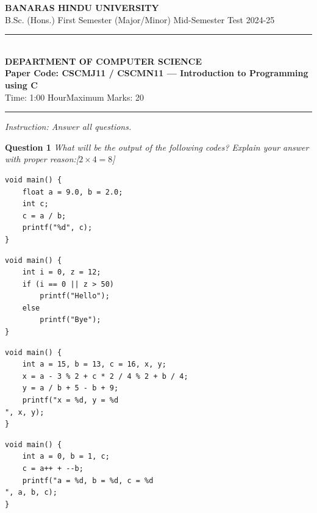 \documentclass[11pt,a4paper]{article}
\newcommand{\pts}[1]{\hfill   \textit{[#1]}}
\begin{document}
\begin{center}
  {\large\bfseries BANARAS HINDU UNIVERSITY}\\[2pt]
  {\normalsize B.Sc. (Hons.) First Semester (Major/Minor) Mid-Semester Test 2024-25}\\[6pt]
  \rule{0.8\linewidth}{0.5pt}\\[6pt]
  {\large\bfseries DEPARTMENT OF COMPUTER SCIENCE}\\[4pt]
  {\large\bfseries Paper Code: CSCMJ11 / CSCMN11 --- Introduction to Programming using C}\\[4pt]
  {\normalsize Time: 1:00 Hour\hfill Maximum Marks: 20}
\end{center}

\rule{\linewidth}{0.4pt}\smallskip



\noindent   \textit{Instruction: Answer all questions.}
\bigskip




\noindent   \textbf{Question 1}   \textit{What will be the output of the following codes? Explain your answer with proper reason:}\pts{$2  \times 4 = 8$}

\begin{parts}
  \item 

\begin{lstlisting}
void main() {
    float a = 9.0, b = 2.0;
    int c;
    c = a / b;
    printf("%d", c);
}
\end{lstlisting}

  \item 

\begin{lstlisting}
void main() {
    int i = 0, z = 12;
    if (i == 0 || z > 50)
        printf("Hello");
    else
        printf("Bye");
}
\end{lstlisting}

  \item 

\begin{lstlisting}
void main() {
    int a = 15, b = 13, c = 16, x, y;
    x = a - 3 % 2 + c * 2 / 4 % 2 + b / 4;
    y = a / b + 5 - b + 9;
    printf("x = %d, y = %d
", x, y);
}
\end{lstlisting}

  \item 

\begin{lstlisting}
void main() {
    int a = 0, b = 1, c;
    c = a++ + --b;
    printf("a = %d, b = %d, c = %d
", a, b, c);
}
\end{lstlisting}
\end{parts}
\end{document}
